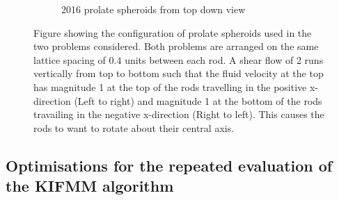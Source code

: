 \begin{figure}
\begin{subfigure}[b]{0.475\textwidth}
            \caption[]%
            {{\small 2016 prolate spheroids from top down view}}    
            \label{fig:mean and std of net44}
        \end{subfigure}
        \caption[Images of Rods in Shear flow]
        {\small Figure showing the configuration of prolate spheroids used in the two problems considered. Both problems are arranged on the same lattice spacing of $0.4$ units between each rod. A shear flow of 2 runs vertically from top to bottom such that the fluid velocity at the top has magnitude 1 at the top of the rods travelling in the positive x-direction (Left to right) and magnitude 1 at the bottom of the rods travailing in the negative x-direction (Right to left). This causes the rods to want to rotate about their central axis. } 
        \label{fig:mean and std of nets}
    \end{figure}


\subsection[Optimisations for the repeated evaluation of the KIFMM algorithm]{Optimisations for the repeated evaluation of the KIFMM algorithm%
}

